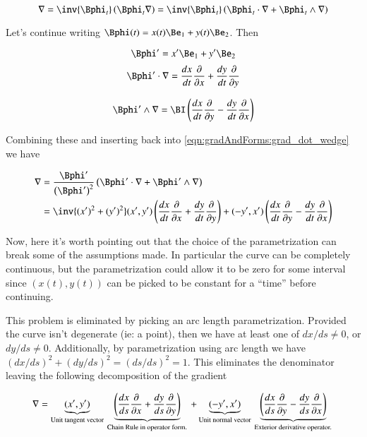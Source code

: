 \begin{equation}\label{eqn:gradAndForms:grad_dot_wedge}
\grad 
= \inv{\Bphi_t}\left( \Bphi_t \grad \right)
= \inv{\Bphi_t}\left( \Bphi_t \cdot \grad + \Bphi_t \wedge \grad \right)
\end{equation}

Let's continue writing $\Bphi(t) = x(t) \Be_1 + y(t) \Be_2$.  Then

\[
\Bphi' = x' \Be_1 + y' \Be_2
\]
\[
\Bphi' \cdot \grad = 
\frac{dx}{dt} \frac{\partial}{\partial x}
+\frac{dy}{dt} \frac{\partial}{\partial y}
\]

\[
\Bphi' \wedge \grad = 
\BI
\left(\frac{dx}{dt} \frac{\partial}{\partial y} -\frac{dy}{dt} \frac{\partial}{\partial x}\right)
\]

Combining these and inserting back into \ref{eqn:gradAndForms:grad_dot_wedge} we have

\begin{align*}
\grad 
&= \frac{\Bphi'}{\left(\Bphi'\right)^2}\left( \Bphi' \cdot \grad + \Bphi' \wedge \grad \right) \\
&=
\inv{(x')^2 + (y')^2}
(x',y')\left(
\frac{dx}{dt} \frac{\partial}{\partial x}
+\frac{dy}{dt} \frac{\partial}{\partial y}
\right)
+
(-y',x')
\left(\frac{dx}{dt} \frac{\partial}{\partial y} -\frac{dy}{dt} \frac{\partial}{\partial x}\right)
\end{align*}

Now, here it's worth pointing out that the choice of the parametrization can break some of the assumptions made.  In particular
the curve can be completely continuous, but the parametrization could allow it to be zero for some interval since $(x(t), y(t))$
can be picked to be constant for a ``time'' before continuing.

This problem is eliminated by picking an arc length parametrization.  Provided the curve isn't degenerate (ie: a point), then
we have at least one of $dx/ds \ne 0$, or $dy/ds \ne 0$.  Additionally, by parametrization using arc length we have
$(dx/ds)^2 + (dy/ds)^2 = (ds/ds)^2 = 1$.  This eliminates the denominator leaving the following decomposition of the  gradient

\begin{equation}
\nabla = 
\underbrace{(x',y')}_{\text{Unit tangent vector}}
\underbrace{
\left(
\frac{dx}{ds} \frac{\partial}{\partial x}
+\frac{dy}{ds} \frac{\partial}{\partial y}
\right)
}_{\text{ Chain Rule in operator form. }}
+ 
\underbrace{(-y',x')}_{\text{Unit normal vector}}
\underbrace{
\left(
\frac{dx}{ds} \frac{\partial}{\partial y}
-\frac{dy}{ds} \frac{\partial}{\partial x}
\right)
}_{\text{ Exterior derivative operator. }}
\end{equation}

